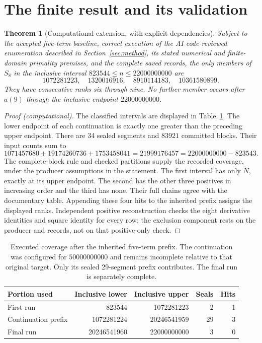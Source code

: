 \documentclass[11pt]{article}
\newtheorem{theorem}{Theorem}[section]
\theoremstyle{definition}
\theoremstyle{remark}
\begin{document}
\section{The finite result and its validation}\label{sec:results}

\begin{theorem}[Computational extension, with explicit dependencies]
\label{thm:result}
Subject to the accepted five-term baseline, correct execution of the
AI code-reviewed enumeration described in Section~\ref{sec:method}, its
stated numerical and finite-domain primality premises, and the
complete saved records, the only members of $S_8$ in the inclusive
interval $823544\le n\le22000000000$ are
\[
 1072281223,\quad1320016916,\quad8910114183,\quad10361580899.
\]
They have consecutive ranks six through nine. No further member
occurs after $a(9)$ through the inclusive endpoint $22000000000$.
\end{theorem}
\begin{proof}[Proof (computational)]
The classified intervals are displayed in Table~\ref{tab:coverage}.
The lower endpoint of each continuation is exactly one greater than
the preceding upper endpoint. There are 34 sealed segments and
$83921$ committed blocks. Their input counts sum to
\[
 1071457680+19174260736+1753458041
   =21999176457=22000000000-823543.
\]
The complete-block rule and checked partitions supply the recorded
coverage, under the producer assumptions in the statement.
The first interval has only $N$, exactly at its upper endpoint.
The second has the other three positives in increasing order and
the third has none. Their full chains agree with the documentary
table. Appending these four hits to the inherited prefix assigns
the displayed ranks. Independent positive reconstruction checks
the eight derivative identities and square identity for every row;
the exclusion component rests on the producer and records, not on
that positive-only check.
\end{proof}

\begin{table}[htbp]
\centering\small
\setlength{\tabcolsep}{4pt}
\begin{tabular}{lrrrr}
\toprule
Portion used & Inclusive lower & Inclusive upper & Seals & Hits\\
\midrule
First run&823544&1072281223&2&1\\
Continuation prefix&1072281224&20246541959&29&3\\
Final run&20246541960&22000000000&3&0\\
\bottomrule
\end{tabular}
\caption{Executed coverage after the inherited five-term prefix.
The continuation was configured for $50000000000$ and remains
incomplete relative to that original target. Only its sealed
29-segment prefix contributes. The final run is separately complete.}
\label{tab:coverage}
\end{table}
\end{document}
